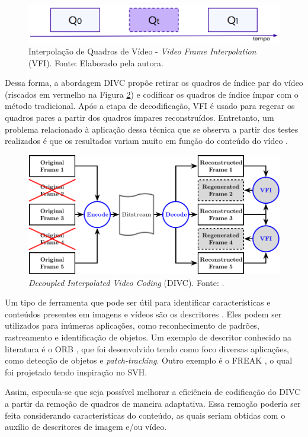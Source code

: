 \begin{figure}[htb]
\centering
\includegraphics[width=0.8\columnwidth,keepaspectratio]{images/vfi1.png}
\caption{Interpolação de Quadros de Vídeo - \textit{Video Frame Interpolation} (VFI). Fonte: Elaborado pela autora.}
\label{fig:vfi}
\end{figure}

Dessa forma, a abordagem \ac{DIVC} propõe retirar os quadros de índice par do vídeo (riscados em vermelho na Figura \ref{fig:divc}) e codificar os quadros de índice ímpar com o método tradicional. Após a etapa de decodificação, \ac{VFI} é usado para regerar os quadros pares a partir dos quadros ímpares reconstruídos. Entretanto, um problema relacionado à aplicação dessa técnica que se observa a partir dos testes realizados é que os resultados variam muito em função do conteúdo do vídeo \cite{ours}.

\begin{figure}[htb]
\centering
\includegraphics[width=0.8\columnwidth,keepaspectratio]{images/hybrid_vfi.pdf}
\caption{\textit{Decoupled Interpolated Video Coding} (DIVC). Fonte: \textcite{ours}.}
\label{fig:divc}
\end{figure}

Um tipo de ferramenta que pode ser útil para identificar características e conteúdos presentes em imagens e vídeos são os descritores \cite{Kumar2014ASO}. Eles podem ser utilizados para inúmeras aplicações, como reconhecimento de padrões, rastreamento e identificação de objetos. Um exemplo de descritor conhecido na literatura é o \ac{ORB} \cite{orb}, que foi desenvolvido tendo como foco diversas aplicações, como detecção de objetos e \textit{patch-tracking}. Outro exemplo é o \ac{FREAK} \cite{freak}, o qual foi projetado tendo inspiração no \ac{SVH}.

Assim, especula-se que seja possível melhorar a eficiência de codificação do \ac{DIVC} a partir da remoção de quadros de maneira adaptativa. Essa remoção poderia ser feita considerando características do conteúdo, as quais seriam obtidas com o auxílio de descritores de imagem e/ou vídeo.

